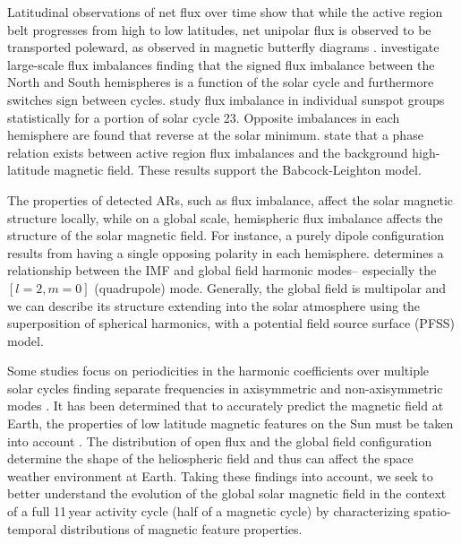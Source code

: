 Latitudinal observations of net flux over time show that while the active region belt progresses from high to low latitudes, net unipolar flux is observed to be transported poleward, as observed in magnetic butterfly diagrams \citep{Harvey:1992}. \citet{Choudhary:2002} investigate large-scale flux imbalances finding that the signed flux imbalance between the North and South hemispheres is a function of the solar cycle and furthermore switches sign between cycles. \citet{zharkov:2006} study flux imbalance in individual sunspot groups statistically for a portion of solar cycle 23. Opposite imbalances in each hemisphere are found that reverse at the solar minimum. \citet{Zharkov:2008} state that a phase relation exists between active region flux imbalances and the background high-latitude magnetic field. These results support the Babcock-Leighton model.

The properties of detected ARs, such as flux imbalance, affect the solar magnetic structure locally, while on a global scale, hemispheric flux imbalance affects the structure of the solar magnetic field. For instance, a purely dipole configuration results from having a single opposing polarity in each hemisphere. 
\citet{mordvinov:2007} determines a relationship between the IMF and global field harmonic modes-- especially the $[l=2,m=0]$ (quadrupole) mode.
Generally, the global field is multipolar and we can describe its structure extending into the solar atmosphere using the superposition of spherical harmonics, with a potential field source surface (PFSS) model. 

Some studies focus on periodicities in the harmonic coefficients over multiple solar cycles finding separate frequencies in axisymmetric and non-axisymmetric modes \citep{stenflo:1986, stenflo:1988, knaack:2005}.
It has been determined that to accurately predict the magnetic field at Earth, the properties of low latitude magnetic features on the Sun must be taken into account \citep{schussler:2006, wang:2003a, Schrijver:2003}. The distribution of open flux and the global field configuration determine the shape of the heliospheric field and thus can affect the space weather environment at Earth.
Taking these findings into account, we seek to better understand the evolution of the global solar magnetic field in the context of a full 11\,year activity cycle (half of a magnetic cycle) by characterizing spatio-temporal distributions of magnetic feature properties.

